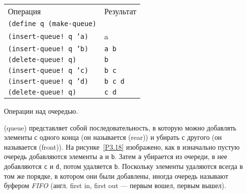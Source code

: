 \begin{cntrfig}
\begin{tabular}{ll}
Операция                        & Результат \\
{\tt (define q (make-queue)}    & \\
{\tt (insert-queue! q 'a)}      & a \\
{\tt (insert-queue! q 'b)}       & {\tt a b} \\
{\tt (delete-queue! q)}          & {\tt b}\\
{\tt (insert-queue! q 'c)}       & {\tt b c}\\
{\tt (insert-queue! q 'd)}       & {\tt b c d}\\
{\tt (delete-queue! q)}          & {\tt c d}\\
\end{tabular}
\caption{Операции над очередью. }
\label{P3.18}
\end{cntrfig}

 (queue) представляет собой
последовательность, в которую можно добавлять элементы с одного конца
(он называется  (rear))
и убирать с другого (он называется
 (front)).  На
рисунке~\ref{P3.18} изображено, как в изначально пустую очередь
добавляются элементы  {\tt a} и {\tt b}.  Затем
{\tt a} убирается из очереди, в нее добавляются {\tt c}
и {\tt d}, потом удаляется {\tt b}.  Поскольку элементы
удаляются всегда в том же порядке, в котором они были добавлены,
иногда очередь называют буфером {\em FIFO} (англ. first in, first out
--- первым вошел, первым вышел).


